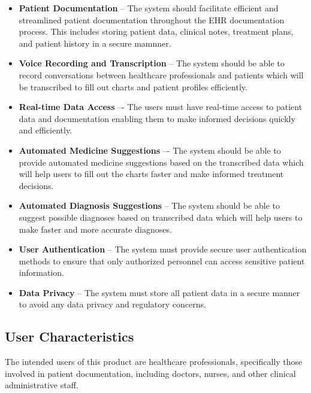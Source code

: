 \documentclass[12pt]{article}
\begin{document}
\begin{itemize}
  \item \textbf{Patient Documentation} -- The system should facilitate efficient and streamlined patient documentation throughout the EHR documentation process. This includes storing patient data, clinical notes, treatment plans, and patient history in a secure mamnner.
  
  \item \textbf{Voice Recording and Transcription} -- The system should be able to record conversations between healthcare professionals and patients which will be transcribed to fill out charts and patient profiles efficiently.
  
  \item \textbf{Real-time Data Access} –- The users must have real-time access to patient data and documentation enabling them to make informed decisions quickly and efficiently.
  
  \item \textbf{Automated Medicine Suggestions} –- The system should be able to provide automated medicine suggestions based on the transcribed data which will help users to fill out the charts faster and make informed treatment decisions.
  
  \item \textbf{Automated Diagnosis Suggestions} -- The system should be able to suggest possible diagnoses based on transcribed data which will help users to make faster and more accurate diagnoses.
  
  \item \textbf{User Authentication} -- The system must provide secure user authentication methods to ensure that only authorized personnel can access sensitive patient information.
  
  \item \textbf{Data Privacy} -- The system must store all patient data in a secure manner to avoid any data privacy and regulatory concerns.
  
\end{itemize}


\subsection{User Characteristics} \label{sec_UserCharacteristics}

The intended users of this product are healthcare professionals, specifically those involved in patient documentation, including doctors, nurses, and other clinical administrative staff. 
\end{document}
